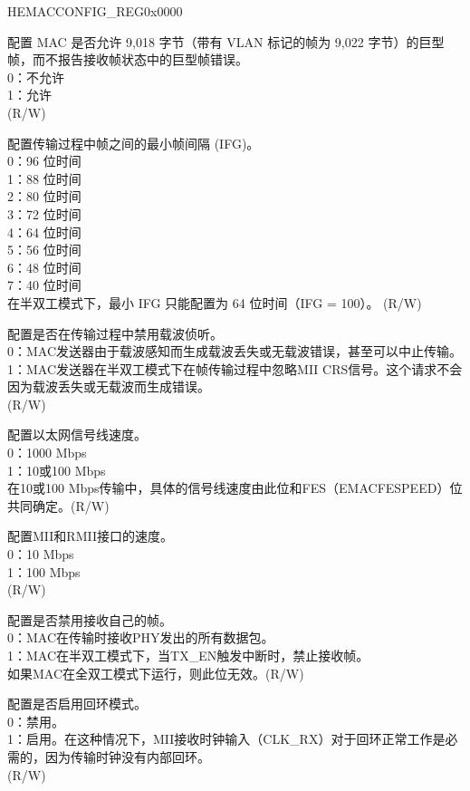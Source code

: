 \begin{register}{H}{EMACCONFIG\_REG}{0x0000}
\begin{regdesc}\begin{reglist}
\item[接上页...]

\item [EMACJUMBOFRAME] 配置 MAC 是否允许 9,018 字节（带有 VLAN 标记的帧为 9,022 字节）的巨型帧，而不报告接收帧状态中的巨型帧错误。\\
0：不允许\\
1：允许\\(R/W)

\item [EMACINTERFRAMEGAP] 配置传输过程中帧之间的最小帧间隔 (IFG)。\\
0：96 位时间\\
1：88 位时间\\
2：80 位时间\\
3：72 位时间\\
4：64 位时间\\
5：56 位时间\\
6：48 位时间\\
7：40 位时间\\
在半双工模式下，最小 IFG 只能配置为 64 位时间（IFG = 100）。 (R/W)

\item [EMACDISABLECRS] 配置是否在传输过程中禁用载波侦听。\\
0：MAC发送器由于载波感知而生成载波丢失或无载波错误，甚至可以中止传输。\\
1：MAC发送器在半双工模式下在帧传输过程中忽略MII CRS信号。这个请求不会因为载波丢失或无载波而生成错误。\\
(R/W)
\item [EMACMII] 配置以太网信号线速度。\\
0：1000 Mbps\\
1：10或100 Mbps\\
在10或100 Mbps传输中，具体的信号线速度由此位和FES（EMACFESPEED）位共同确定。(R/W)
\item [EMACFESPEED] 配置MII和RMII接口的速度。\\
0：10 Mbps\\
1：100 Mbps\\(R/W)
\item [EMACRXOWN] 配置是否禁用接收自己的帧。\\
0：MAC在传输时接收PHY发出的所有数据包。\\
1：MAC在半双工模式下，当TX\_EN触发中断时，禁止接收帧。\\
如果MAC在全双工模式下运行，则此位无效。(R/W)
\item [EMACLOOPBACK] 配置是否启用回环模式。\\
0：禁用。\\
1：启用。在这种情况下，MII接收时钟输入（CLK\_RX）对于回环正常工作是必需的，因为传输时钟没有内部回环。\\(R/W)

\item[见下页...]
\end{reglist}\end{regdesc}
\end{register}
